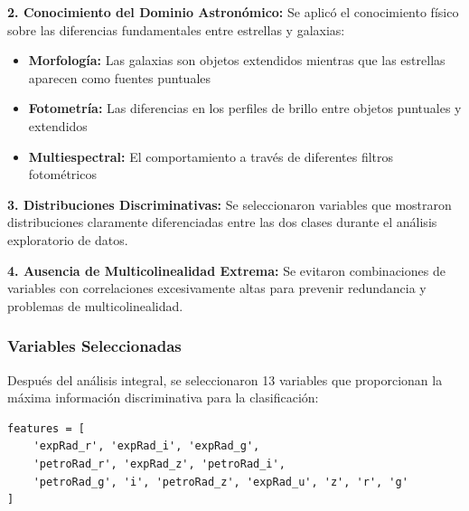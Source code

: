 \documentclass{article}
\begin{document}
\textbf{2. Conocimiento del Dominio Astronómico:}
Se aplicó el conocimiento físico sobre las diferencias fundamentales entre estrellas y galaxias:
\begin{itemize}
    \item \textbf{Morfología:} Las galaxias son objetos extendidos mientras que las estrellas aparecen como fuentes puntuales
    \item \textbf{Fotometría:} Las diferencias en los perfiles de brillo entre objetos puntuales y extendidos
    \item \textbf{Multiespectral:} El comportamiento a través de diferentes filtros fotométricos
\end{itemize}

\textbf{3. Distribuciones Discriminativas:}
Se seleccionaron variables que mostraron distribuciones claramente diferenciadas entre las dos clases durante el análisis exploratorio de datos.

\textbf{4. Ausencia de Multicolinealidad Extrema:}
Se evitaron combinaciones de variables con correlaciones excesivamente altas para prevenir redundancia y problemas de multicolinealidad.

\subsubsection{Variables Seleccionadas}

Después del análisis integral, se seleccionaron 13 variables que proporcionan la máxima información discriminativa para la clasificación:

\begin{verbatim}
features = [
    'expRad_r', 'expRad_i', 'expRad_g',
    'petroRad_r', 'expRad_z', 'petroRad_i',
    'petroRad_g', 'i', 'petroRad_z', 'expRad_u', 'z', 'r', 'g'
]
\end{verbatim}


\end{document}
